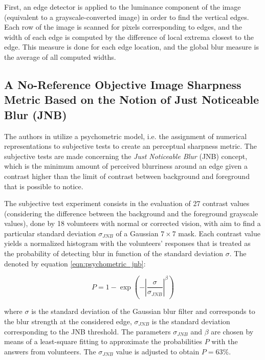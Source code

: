 First, an edge detector is applied to the luminance component of the image (equivalent to a grayscale-converted image) in order to find the vertical edges. Each row of the image is scanned for pixels corresponding to edges, and the width of each edge is computed by the difference of local extrema closest to the edge. This measure is done for each edge location, and the global blur measure is the average of all computed widths.

\subsection{A No-Reference Objective Image Sharpness Metric Based on the Notion of Just Noticeable Blur (JNB)}
\label{subsec:jnb_approach}

The authors in \cite{ferzli2009noreference} utilize a psychometric model, i.e. the assignment of numerical representations to subjective tests to create an perceptual sharpness metric. The subjective tests are made concerning the \emph{Just Noticeable Blur} (JNB) concept, which is the minimum amount of perceived blurriness around an edge given a contrast higher than the limit of contrast between background and foreground that is possible to notice. 

The subjective test experiment consists in the evaluation of 27 contrast values (considering the difference between the background and the foreground grayscale values), done by 18 volunteers with normal or corrected vision, with aim to find a particular standard deviation $\sigma_{JNB}$ of a Gaussian $7 \times 7$ mask. Each contrast value yields a normalized histogram with the volunteers' responses that is treated as the probability of detecting blur in function of the standard deviation $\sigma$. The denoted by equation \ref{eqn:psychometric_jnb}:

\begin{equation}
\label{eqn:psychometric_jnb}
P = 1 - \exp{\left( - \left| \frac{\sigma}{\sigma_{JNB} } \right|^{\beta} \right)}
\end{equation}

\noindent where $\sigma$ is the standard deviation of the Gaussian blur filter and corresponds to the blur strength at the considered edge, $\sigma_{JNB}$ is the standard deviation corresponding to the JNB threshold. The parameters $\sigma_{JNB}$ and $\beta$ are chosen by means of a least-square fitting to approximate the probabilities $P$ with the answers from volunteers. The $\sigma_{JNB}$ value is adjusted to obtain $P = 63\%$.

